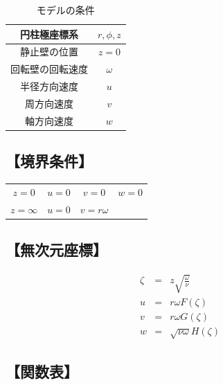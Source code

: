 \documentclass[twocolumn,a4j]{jsarticle}
\begin{document}
\begin{table}[hbtp]
  \label{table:data_type}
  \caption{モデルの条件}
  \centering
  \begin{tabular}{ c | c }
    \hline
    円柱極座標系     & $r, \phi, z$ \\ \hline
    静止壁の位置     & $z = 0$      \\ \hline
    回転壁の回転速度 & $\omega$     \\ \hline
    半径方向速度     & $u$          \\ \hline
    周方向速度       & $v$          \\ \hline
    軸方向速度       & $w$          \\ \hline
  \end{tabular}
\end{table}

\subsection*{【境界条件】}
\begin{table}[hbtp]
  \centering
  \begin{tabular}{ c c c c }
    $z=0$      & $u=0$ & $v=0$        & $w=0$ \\
    $z=\infty$ & $u=0$ & $v=r \omega$ &       \\
  \end{tabular}
\end{table}

\newpage

\subsection*{【無次元座標】}
\begin{eqnarray*}
  \zeta &=& z \sqrt{\frac{\omega}{\nu}}\\
  u &=& r \omega F \left(\zeta\right)\\
  v &=& r \omega G \left(\zeta\right)\\
  w &=& \sqrt{\nu \omega} H \left(\zeta\right)
\end{eqnarray*}

\subsection*{【関数表】}
\end{document}
